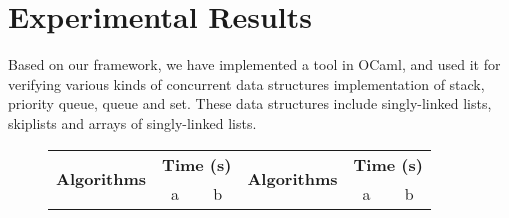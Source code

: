 \section{Experimental Results}
\label{section:experiments}
\newcommand{\emm}{(emm)}

 Based on our framework, we have implemented a tool in OCaml, and used it for verifying various kinds of concurrent data structures implementation of stack, priority queue, queue and set. These data structures include singly-linked lists, skiplists and arrays of singly-linked lists.
\begin{figure}[]
\center
\begin{tabular}{|l | r| r | l | r | r |}
  \hline
  \multirow{2}{*}{\textsf{{\textbf{Algorithms}}}} &   \multicolumn{2}{c|}{\textsf{{\textbf{Time (s)}}}} & \multirow{2}{*}{\textsf{{\textbf{Algorithms}}}} &  \multicolumn{2}{c|}{\textsf{{\textbf{Time (s)}}}}  \\
   \cline{2-3} \cline{5-6} 
& \multicolumn{1}{c|}{\textsf{a}} & \multicolumn{1}{c|}{\textsf{b}} & & \multicolumn{1}{c|}{\textsf{a}} & \multicolumn{1}{c|}{\textsf{b}} \\
\hline
%
%
%
% 
%
%
%
%




\end{tabular}
\end{figure}
